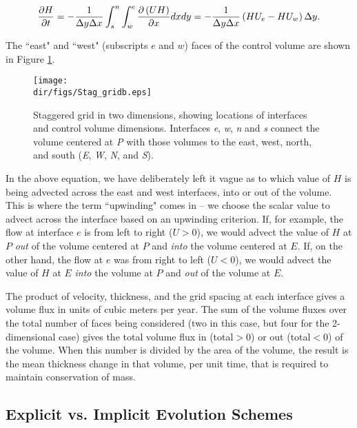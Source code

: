 \begin{equation}
\frac{\partial H}{\partial t}=-\frac{1}{\Delta y\Delta x}\int_{s}^{n}{\int_{w}^{e}{\frac{\partial \left( UH \right)}{\partial x}}}dxdy=-\frac{1}{\Delta y\Delta x}\left( HU_{e}-HU_{w} \right)\Delta y. \\
\end{equation}

\noindent
The ``east" and ``west" (subscripts $e$ and $w$) faces of the control volume are shown in Figure \ref{fig:stag_c_grid2}.

\begin{figure}
  \begin{center}
    \texttt{[image: \\dir/figs/Stag\_gridb.eps]}
  \end{center}
  \caption{Staggered grid in two dimensions, showing locations of interfaces and control volume dimensions. Interfaces \textit{e}, \textit{w}, \textit{n} and \textit{s} connect the volume centered at \textit{P} with those volumes to the east, west, north, and south (\textit{E}, \textit{W}, \textit{N}, and \textit{S}).}
  \label{fig:stag_c_grid2}
\end{figure} 

In the above equation, we have deliberately left it vague as to which value of $H$ is being advected across the east and west interfaces, into or out of the volume. This is where the term ``upwinding" comes in -- we choose the scalar value to advect across the interface based on an upwinding criterion. If, for example, the flow at interface $e$ is from left to right ($U>0$), we would advect the value of $H$ at $P$ \textit{out} of the volume centered at $P$ and \textit{into} the volume centered at $E$. If, on the other hand, the flow at $e$ was from right to left ($U<0$), we would advect the value of $H$ at $E$ \textit{into} the volume at $P$ and \textit{out} of the volume at $E$. 

The product of velocity, thickness, and the grid spacing at each interface gives a volume flux in units of cubic meters per year. The sum of the volume fluxes over the total number of faces being considered (two in this case, but four for the 2-dimensional case) gives the total volume flux in (total$>$0) or out (total$<$0) of the volume. When this number is divided by the area of the volume, the result is the mean thickness change in that volume, per unit time, that is required to maintain conservation of mass.

\subsection{Explicit vs. Implicit Evolution Schemes}

